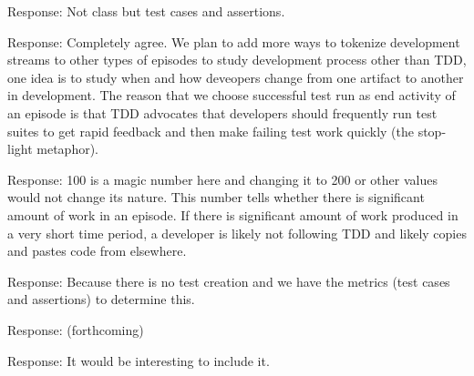 \documentclass[11pt]{article}
\begin{document}

\noindent Response: Not class but test cases and assertions.


\noindent Response: Completely agree. We plan to add more ways to tokenize development streams to other types of episodes to study development process 
other than TDD, one idea is to study when and how deveopers change from one artifact to another in development. The reason that we choose successful test run as end activity of an episode is that TDD advocates that developers should frequently run test suites to get rapid feedback and then make failing test work quickly (the stop-light metaphor). 


\noindent Response: 100 is a magic number here and changing it to 200 or other values would not change its nature. This number tells whether there is  significant amount of work in an episode. If there is significant amount of work produced in a very short time period, a developer is likely not following TDD and likely copies and pastes code from elsewhere. 


\noindent Response: Because there is no test creation and we have the metrics
(test cases and assertions) to determine this.


\noindent Response: (forthcoming)


\noindent Response: It would be interesting to include it.
\end{document}
